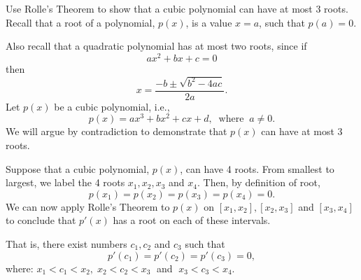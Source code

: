 \documentclass{ximera}
\begin{document}
\begin{example} Use Rolle's Theorem  to show that a cubic polynomial can have at most 3 roots.\\
Recall that a root of a polynomial, $p(x)$, is a value $x = a$, such that $p(a) = 0$.

Also recall that a quadratic polynomial has at most two roots, since if
\[
ax^2 + bx + c = 0
\]
then
\[
x = \frac{-b \pm \sqrt{b^2 - 4ac}}{2a}.
\]
Let $p(x)$ be a cubic polynomial, i.e., 
\[
p(x) = ax^3 + bx^2 + cx + d, \;\; \text{where} \;\; a\neq 0.
\]
We will argue by contradiction to demonstrate that $p(x)$ can have at most 3 roots.

Suppose that a cubic polynomial, $p(x)$, can have 4 roots.  From smallest to largest, we label the 4 roots $x_1, x_2, x_3$ and $x_4$.
Then, by definition of root,
\[
p(x_1) = p(x_2) = p(x_3) = p(x_4) = 0.
\]
We can now apply Rolle's Theorem to $p(x)$ on $[x_1, x_2], [x_2, x_3]$ and $[x_3, x_4]$ to conclude
that $p'(x)$ has a root on each of these intervals. 

That is, there exist numbers $c_1, c_2$ and $c_3$ such that
\[
p'(c_1) = p'(c_2) = p'(c_3) = 0,
\]
where: $x_1 < c_1 < x_2, \; x_2 < c_2 < x_3 \;$ and $\; x_3 < c_3 < x_4$.

\begin{image}
\end{image}


\end{example}
\end{document}
